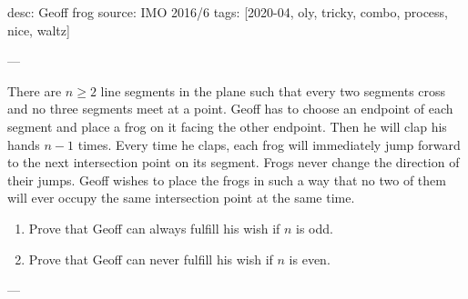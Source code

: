 desc: Geoff frog
source: IMO 2016/6
tags: [2020-04, oly, tricky, combo, process, nice, waltz]

---

There are $n\ge2$ line segments in the plane such that every two segments cross and no three segments meet at a point. Geoff has to choose an endpoint of each segment and place a frog on it facing the other endpoint. Then he will clap his hands $n-1$ times. Every time he claps, each frog will immediately jump forward to the next intersection point on its segment. Frogs never change the direction of their jumps. Geoff wishes to place the frogs in such a way that no two of them will ever occupy the same intersection point at the same time.
\begin{enumerate}[label=(\alph*),itemsep=0em]
    \item Prove that Geoff can always fulfill his wish if $n$ is odd.
    \item Prove that Geoff can never fulfill his wish if $n$ is even.
\end{enumerate}

---

